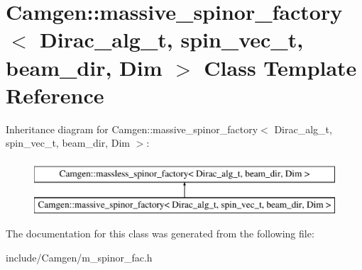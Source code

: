 \hypertarget{a00347}{}\section{Camgen\+:\+:massive\+\_\+spinor\+\_\+factory$<$ Dirac\+\_\+alg\+\_\+t, spin\+\_\+vec\+\_\+t, beam\+\_\+dir, Dim $>$ Class Template Reference}
\label{a00347}
Inheritance diagram for Camgen\+:\+:massive\+\_\+spinor\+\_\+factory$<$ Dirac\+\_\+alg\+\_\+t, spin\+\_\+vec\+\_\+t, beam\+\_\+dir, Dim $>$\+:\begin{figure}[H]
\begin{center}
\leavevmode
\includegraphics[height=2.000000cm]{a00347}
\end{center}
\end{figure}


The documentation for this class was generated from the following file\+:\begin{DoxyCompactItemize}
\item 
include/\+Camgen/m\+\_\+spinor\+\_\+fac.\+h\end{DoxyCompactItemize}
